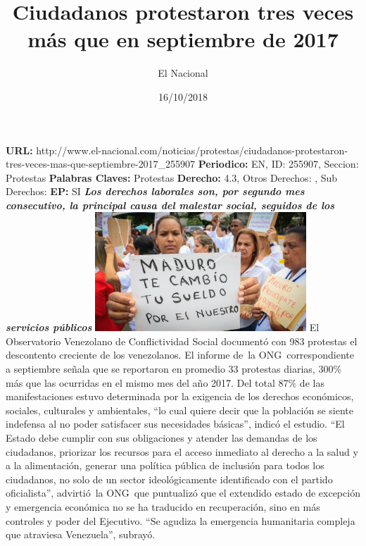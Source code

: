 \documentclass{article}%
\title{\textbf{Ciudadanos protestaron tres veces más que en septiembre de 2017}}%
\author{El Nacional}%
\date{16/10/2018}%
\begin{document}
%
\normalsize%
\maketitle%
\textbf{URL: }%
http://www.el{-}nacional.com/noticias/protestas/ciudadanos{-}protestaron{-}tres{-}veces{-}mas{-}que{-}septiembre{-}2017\_255907\newline%
%
\textbf{Periodico: }%
EN, %
ID: %
255907, %
Seccion: %
Protestas\newline%
%
\textbf{Palabras Claves: }%
Protestas\newline%
%
\textbf{Derecho: }%
4.3, %
Otros Derechos: %
, %
Sub Derechos: %
\newline%
%
\textbf{EP: }%
SI\newline%
\newline%
%
\textbf{\textit{Los derechos laborales son, por segundo mes consecutivo, la principal causa del malestar social, seguidos de los servicios públicos}}%
\newline%
\newline%
%
\includegraphics[width=300px]{12.jpg}%
\newline%
%
El Observatorio Venezolano de Conflictividad Social documentó con 983 protestas el descontento creciente de los venezolanos. El informe de~la ONG~correspondiente a septiembre señala que se reportaron en promedio 33 protestas diarias, 300\% más que las ocurridas en el mismo mes del año 2017. Del total 87\% de las manifestaciones estuvo determinada por la exigencia de los derechos económicos, sociales, culturales y ambientales, “lo cual quiere decir que la población se siente indefensa al no poder satisfacer sus necesidades básicas”, indicó el estudio.%
\newline%
%
“El Estado debe cumplir con sus obligaciones y atender las demandas de los ciudadanos, priorizar los recursos para el acceso inmediato al derecho a la salud y a la alimentación, generar una política pública de inclusión para todos los ciudadanos, no solo de un sector ideológicamente identificado con el partido oficialista”, advirtió~la ONG~que puntualizó que el extendido estado de excepción y emergencia económica no se ha traducido en recuperación, sino en más controles y poder del Ejecutivo. “Se agudiza la emergencia humanitaria compleja que atraviesa Venezuela”, subrayó.%
\end{document}
